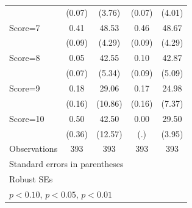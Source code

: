 \begin{table}[htbp]
\begin{tabular}{l*{4}{c}}
                &   (0.07)         &   (3.76)         &   (0.07)         &   (4.01)         \\
Score=7         &     0.41\sym{***}&    48.53\sym{***}&     0.46\sym{***}&    48.67\sym{***}\\
                &   (0.09)         &   (4.29)         &   (0.09)         &   (4.29)         \\
Score=8         &     0.05         &    42.55\sym{***}&     0.10         &    42.87\sym{***}\\
                &   (0.07)         &   (5.34)         &   (0.09)         &   (5.09)         \\
Score=9         &     0.18         &    29.06\sym{***}&     0.17         &    24.98\sym{***}\\
                &   (0.16)         &  (10.86)         &   (0.16)         &   (7.37)         \\
Score=10        &     0.50         &    42.50\sym{***}&     0.00         &    29.50\sym{***}\\
                &   (0.36)         &  (12.57)         &      (.)         &   (3.95)         \\
\hline
Observations    &      393         &      393         &      393         &      393         \\
\hline\hline
\multicolumn{5}{l}{\footnotesize Standard errors in parentheses}\\
\multicolumn{5}{l}{\footnotesize Robust SEs}\\
\multicolumn{5}{l}{\footnotesize \sym{*} \(p<0.10\), \sym{**} \(p<0.05\), \sym{***} \(p<0.01\)}\\
\end{tabular}
\end{table}
